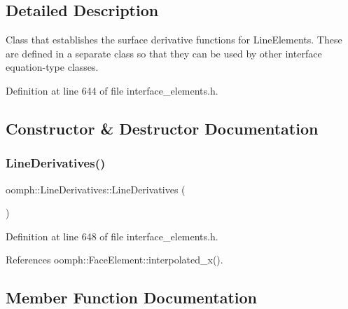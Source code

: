 \subsection{Detailed Description}
Class that establishes the surface derivative functions for Line\+Elements. These are defined in a separate class so that they can be used by other interface equation-\/type classes. 

Definition at line 644 of file interface\+\_\+elements.\+h.



\subsection{Constructor \& Destructor Documentation}
\mbox{\label{classoomph_1_1LineDerivatives_ab8e7af32651605a82d53995caddbe7fb}} 
\subsubsection{\texorpdfstring{Line\+Derivatives()}{LineDerivatives()}}
{\footnotesize\ttfamily oomph\+::\+Line\+Derivatives\+::\+Line\+Derivatives (\begin{DoxyParamCaption}{ }\end{DoxyParamCaption})\hspace{0.3cm}{\ttfamily [inline]}}



Definition at line 648 of file interface\+\_\+elements.\+h.



References oomph\+::\+Face\+Element\+::interpolated\+\_\+x().



\subsection{Member Function Documentation}
\mbox{\label{classoomph_1_1LineDerivatives_aa50209ce504b25d255f9f0a6df36c0e3}} 
